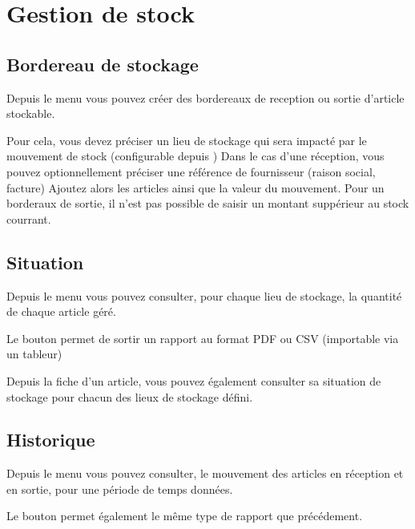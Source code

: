 \documentclass[a4paper,10pt,oneside,french]{sphinxmanual}
\begin{document}
\section{Gestion de stock}
\label{\detokenize{invoice/stock:gestion-de-stock}}\label{\detokenize{invoice/stock::doc}}

\subsection{Bordereau de stockage}
\label{\detokenize{invoice/stock:bordereau-de-stockage}}
Depuis le menu  vous pouvez créer des bordereaux de reception ou sortie d’article stockable.

Pour cela, vous devez préciser un lieu de stockage qui sera impacté par le mouvement de stock (configurable depuis )
Dans le cas d’une réception, vous pouvez optionnellement préciser une référence de fournisseur (raison social, facture)
Ajoutez alors les articles ainsi que la valeur du mouvement.
Pour un borderaux de sortie, il n’est pas possible de saisir un montant suppérieur au stock courrant.


\subsection{Situation}
\label{\detokenize{invoice/stock:situation}}
Depuis le menu  vous pouvez consulter, pour chaque lieu de stockage, la quantité de chaque article géré.

Le bouton  permet de sortir un rapport au format PDF ou CSV (importable via un tableur)

Depuis la fiche d’un article, vous pouvez également consulter sa situation de stockage pour chacun des lieux de stockage défini.


\subsection{Historique}
\label{\detokenize{invoice/stock:historique}}
Depuis le menu  vous pouvez consulter, le mouvement des articles en réception et en sortie, pour une période de temps données.

Le bouton  permet également le même type de rapport que précédement.
\end{document}
